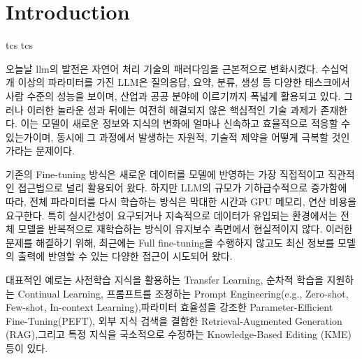 \documentclass[a4paper,fleqn]{cas-sc}
\begin{document}
\maketitle

\section{Introduction}
\gls{tcs}
\gls{tcs}

오늘날 \gls{llm}의 발전은 자연어 처리 기술의 패러다임을 근본적으로 변화시켰다. 
수십억 개 이상의 파라미터를 가진 LLM은 질의응답, 요약, 분류, 생성 등 다양한 태스크에서 사람 수준의 성능을 보이며, 산업과 공공 분야에 이르기까지 폭넓게 활용되고 있다. 
그러나 이러한 놀라운 성과 뒤에는 여전히 해결되지 않은 핵심적인 기술 과제가 존재한다. 
이는 모델이 새로운 정보와 지식의 변화에 얼마나 신속하고 효율적으로 적응할 수 있는가이며, 동시에 그 과정에서 발생하는 자원적, 기술적 제약을 어떻게 극복할 것인가라는 문제이다.

기존의 Fine-tuning 방식은 새로운 데이터를 모델에 반영하는 가장 직접적이고 직관적인 접근법으로 널리 활용되어 왔다. 
하지만 LLM의 규모가 기하급수적으로 증가함에 따라, 전체 파라미터를 다시 학습하는 방식은 막대한 시간과 GPU 메모리, 연산 비용을 요구한다. 
특히 실시간성이 요구되거나 지속적으로 데이터가 유입되는 환경에서는 전체 모델을 반복적으로 재학습하는 방식이 유지보수 측면에서 현실적이지 않다. 
이러한 문제를 해결하기 위해, 최근에는 Full fine-tuning을 수행하지 않고도 최신 정보를 모델의 출력에 반영할 수 있는 다양한 접근이 시도되어 왔다. 

대표적인 예로는 사전학습 지식을 활용하는 Transfer Learning, 순차적 학습을 지원하는 Continual Learning, 프롬프트를 조정하는 Prompt Engineering(e.g., Zero-shot, Few-shot, In-context Learning),파라미터 효율성을 강조한 Parameter-Efficient Fine-Tuning(PEFT), 외부 지식 검색을 결합한 Retrieval-Augmented Generation (RAG),그리고 특정 지식을 국소적으로 수정하는 Knowledge-Based Editing (KME) 등이 있다.
\end{document}
